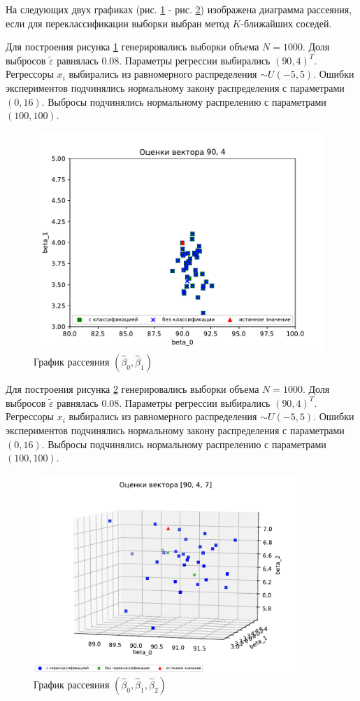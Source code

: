 На следующих двух графиках (рис. \ref{pic4} - рис. \ref{pic5}) изображена диаграмма рассеяния, если для переклассификации выборки выбран метод $K$-ближайших соседей.

Для построения рисунка \ref{pic4} генерировались выборки объема $N = 1000$. Доля выбросов $\widetilde{\varepsilon}$ равнялась $0.08$. 
Параметры регрессии выбирались $(90, 4)^T$. 
Регрессоры $x_i$ выбирались из равномерного распределения $\sim U(-5,5)$. 
Ошибки экспериментов подчинялись нормальному закону распределения с параметрами $(0, 16)$. Выбросы подчинялись нормальному распрелению с параметрами $(100, 100)$. 

\begin{figure}[h]
    \centering
    \includegraphics[width=110mm]{../images/plot_90_4_with-without_(3).pdf}
    \caption{График рассеяния $(\hat{\beta}_0,\hat{\beta}_1)$\label{overflow}}
    \label{pic4}
\end{figure}

Для построения рисунка \ref{pic5} генерировались выборки объема $N = 1000$. Доля выбросов $\widetilde{\varepsilon}$ равнялась $0.08$. 
Параметры регрессии выбирались $(90, 4)^T$. 
Регрессоры $x_i$ выбирались из равномерного распределения $\sim U(-5,5)$. 
Ошибки экспериментов подчинялись нормальному закону распределения с параметрами $(0, 16)$. Выбросы подчинялись нормальному распрелению с параметрами $(100, 100)$. 
\newpage

\begin{figure}[h]
    \centering
    \includegraphics[width=100mm]{../images/plot_90_4_7_(4).pdf}
    \caption{График рассеяния $(\hat{\beta}_0,\hat{\beta}_1, \hat{\beta}_2)$\label{overflow}}
    \label{pic5}
\end{figure}

